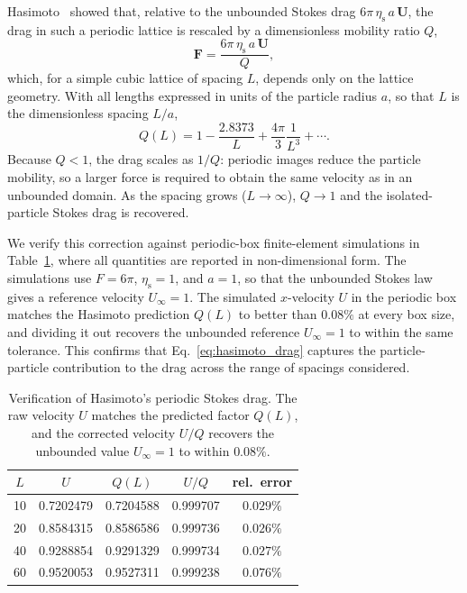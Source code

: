 \documentclass{elsarticle}
\renewcommand{\vec}[1]{\boldsymbol{#1}}
\begin{document}
Hasimoto~\cite{hasimoto1959periodic} showed that, relative to the
unbounded Stokes drag $6\pi\,\eta_{\mathrm{s}}\,a\,\vec{U}$, the drag in
such a periodic lattice is rescaled by a dimensionless mobility ratio
$Q$,
\begin{equation}
\vec{F} = \dfrac{6\pi\,\eta_{\mathrm{s}}\,a\,\vec{U}}{Q},
\label{eq:hasimoto_drag}
\end{equation}
which, for a simple cubic lattice of spacing $L$, depends only on the
lattice geometry. With all lengths expressed in units of the particle
radius $a$, so that $L$ is the dimensionless spacing $L/a$,
\begin{equation}
Q(L) = 1 - \dfrac{2.8373}{L} + \dfrac{4\pi}{3}\dfrac{1}{L^{3}} + \cdots.
\label{eq:hasimoto_Q}
\end{equation}
Because $Q<1$, the drag scales as $1/Q$: periodic images reduce the
particle mobility, so a larger force is required to obtain the same
velocity as in an unbounded domain. As the spacing grows
($L\to\infty$), $Q\to1$ and the isolated-particle Stokes drag is
recovered.

We verify this correction against periodic-box finite-element simulations in
Table~\ref{tab:hasimoto}, where all quantities are reported in
non-dimensional form. The simulations use $F=6\pi$,
$\eta_{\mathrm{s}}=1$, and $a=1$, so that the unbounded Stokes law gives
a reference velocity $U_{\infty}=1$. The simulated $x$-velocity $U$ in
the periodic box matches the Hasimoto prediction $Q(L)$ to better than
$0.08\%$ at every box size, and dividing it out recovers the unbounded
reference $U_{\infty}=1$ to within the same tolerance. This confirms that
Eq.~\eqref{eq:hasimoto_drag} captures the particle-particle contribution
to the drag across the range of spacings considered.

\begin{table}[!ht]
\centering
\begin{tabular}{ccccc}
\toprule
$L$ & $U$ & $Q(L)$ & $U/Q$ & rel.\ error \\
\midrule
10 & 0.7202479 & 0.7204588 & 0.999707 & $0.029\%$ \\
20 & 0.8584315 & 0.8586586 & 0.999736 & $0.026\%$ \\
40 & 0.9288854 & 0.9291329 & 0.999734 & $0.027\%$ \\
60 & 0.9520053 & 0.9527311 & 0.999238 & $0.076\%$ \\
\bottomrule
\end{tabular}
\caption{Verification of Hasimoto's periodic Stokes drag. The raw
velocity $U$ matches the predicted factor $Q(L)$, and the corrected
velocity $U/Q$ recovers the unbounded value $U_{\infty}=1$ to within
$0.08\%$.}
\label{tab:hasimoto}
\end{table}
\end{document}
